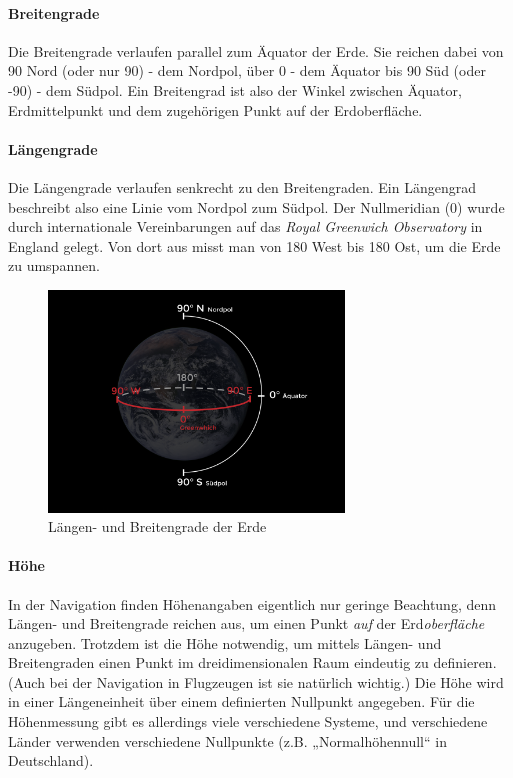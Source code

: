 \documentclass[12pt,a4paper]{scrartcl}
\begin{document}
\paragraph{Breitengrade} Die Breitengrade verlaufen parallel zum Äquator der Erde. Sie reichen dabei von 90\degree{} Nord (oder nur 90\degree) - dem Nordpol, über 0\degree{} - dem Äquator bis 90\degree{} Süd (oder -90\degree) - dem Südpol. Ein Breitengrad ist also der Winkel zwischen Äquator, Erdmittelpunkt und dem zugehörigen Punkt auf der Erdoberfläche.

\paragraph{Längengrade}
Die Längengrade verlaufen senkrecht zu den Breitengraden. Ein Längengrad beschreibt also eine Linie vom Nordpol zum Südpol. Der Nullmeridian (0\degree{}) wurde durch internationale Vereinbarungen auf das \emph{Royal Greenwich Observatory} in England gelegt. Von dort aus misst man von 180\degree{} West bis 180\degree{} Ost, um die Erde zu umspannen.

\begin{figure}
\centering
\includegraphics[width=0.7\textwidth]{img/latlong-01.png}
\caption{Längen- und Breitengrade der Erde}
\end{figure}

\paragraph{Höhe}
In der Navigation finden Höhenangaben eigentlich nur geringe Beachtung, denn Längen- und Breitengrade reichen aus, um einen Punkt \emph{auf} der Erd\emph{oberfläche} anzugeben. Trotzdem ist die Höhe notwendig, um mittels Längen- und Breitengraden einen Punkt im dreidimensionalen Raum eindeutig zu definieren. (Auch bei der Navigation in Flugzeugen ist sie natürlich wichtig.) Die Höhe wird in einer Längeneinheit über einem definierten Nullpunkt angegeben. Für die Höhenmessung gibt es allerdings viele verschiedene Systeme, und verschiedene Länder verwenden verschiedene Nullpunkte (z.B. „Normalhöhennull“ in Deutschland).
\end{document}
